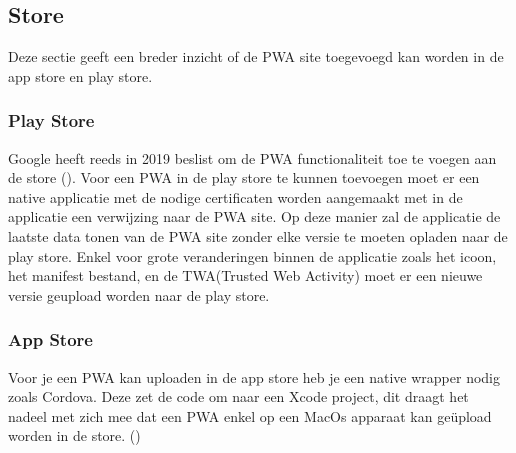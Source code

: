 \subsection{Store}
Deze sectie geeft een breder inzicht of de PWA site toegevoegd kan worden in de app store en play store.

\subsubsection{Play Store}
Google heeft reeds in 2019 beslist om de PWA functionaliteit toe te voegen aan de store (\cite{PLAYSTORE}). Voor een PWA in de play store te kunnen toevoegen moet er een native applicatie met de nodige certificaten worden aangemaakt met in de applicatie een verwijzing naar de PWA site. Op deze manier zal de applicatie de laatste data tonen van de PWA site zonder elke versie te moeten opladen naar de play store. Enkel voor grote veranderingen binnen de applicatie zoals het icoon, het manifest bestand, en de TWA(Trusted Web Activity) moet er een nieuwe versie geupload worden naar de play store.

\subsubsection{App Store}
Voor je een PWA kan uploaden in de app store heb je een native wrapper nodig zoals Cordova. Deze zet de code om naar een Xcode project, dit draagt het nadeel met zich mee dat een PWA enkel op een MacOs apparaat kan geüpload worden in de store. (\cite{APPSTORE})

